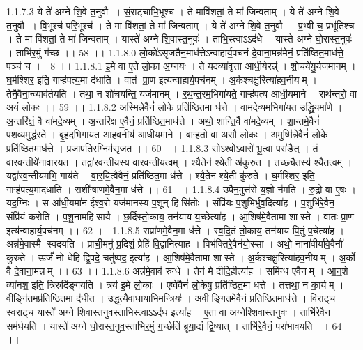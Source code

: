 1.1.7.3
ये ते॑ अग्ने शि॒वे त॒नुवौ । सं॒राट्चा॑भि॒भूश्च॑ । ते मावि॑शतां॒ ते मा॑ जिन्वताम् । ये ते॑ अग्ने शि॒वे त॒नुवौ । वि॒भूश्च॑ परि॒भूश्च॑ । ते मा वि॑शतां॒ ते मा॑ जिन्वताम् । ये ते॑ अग्ने शि॒वे त॒नुवौ । प्र॒भ्वी च॒ प्रभू॑तिश्च । ते मा वि॑शतां॒ ते मा॑ जिन्वताम् । यास्ते॑ अग्ने शि॒वास्त॒नुवः॑ । ताभि॒स्त्वाऽऽद॑धे । यास्ते॑ अग्ने घो॒रास्त॒नुवः॑ । ताभि॑र॒मुं ग॑च्छ ।। 58 ।।
1.1.8.0
लो॒को॑ऽसृजतैन॒माध॑त्तेऽन्वाहार्य॒पच॑नं दे॒वाना॒मन्न॑मेनं॒ प्रति॑ष्ठित॒माध॑त्ते॒ पञ्च॑ च ।। 8 ।।
1.1.8.1
इ॒मे वा ए॒ते लो॒का अ॒ग्नयः॑ । ते यदव्या॑वृत्ता आधी॒येरन्न्॑ । शो॒चये॑यु॒र्यज॑मानम् । घ॒र्मश्शिर॒ इति॒ गाऱ्ह॑पत्य॒मा द॑धाति । वात॑ प्रा॒ण इत्य॑न्वाहार्य॒पच॑नम् । अ॒र्कश्चक्षु॒रित्या॑हव॒नीयम् । तेनै॒वैना॒न्व्याव॑र्तयति । तथा॒ न शो॑चयन्ति॒ यज॑मानम् । र॒थ॒न्त॒रम॒भिगा॑यते॒ गाऱ्ह॑पत्य आधी॒यमा॑ने । राथ॑न्तरो॒ वा अ॒यं लो॒कः ।। 59 ।।
1.1.8.2
अ॒स्मिन्ने॒वैनं॑ लो॒के प्रति॑ष्ठित॒मा ध॑त्ते । वा॒म॒दे॒व्यम॒भिगा॑यत उद्ध्रि॒यमा॑णे । अ॒न्तरि॑क्षं॒ वै वा॑मदे॒व्यम् । अ॒न्तरि॑क्ष ए॒वैनं॒ प्रति॑ष्ठित॒माध॑त्ते । अथो॒ शान्ति॒र्वै वा॑मदे॒व्यम् । शा॒न्तमे॒वैनं॑ पश॒व्य॑मुद्ध॑रते । बृ॒हद॒भिगा॑यत आहव॒नीय॑ आधी॒यमा॑ने । बाऱ्ह॑तो॒ वा अ॒सौ लो॒कः । अ॒मुष्मि॑न्ने॒वैनं॑ लो॒के प्रति॑ष्ठित॒माध॑त्ते । प्र॒जाप॑तिर॒ग्निम॑सृजत ।। 60 ।।
1.1.8.3
सोऽश्वो॒ऽवारो॑ भू॒त्वा परा॑ङैत् । तं वा॑रव॒न्तीये॑नावारयत । तद्वा॑रव॒न्तीय॑स्य वारवन्तीय॒त्वम् । श्यै॒तेन॑ श्ये॒ती अ॑कुरुत । तच्छ्यै॒तस्य॑ श्यैत॒त्वम् । यद्वा॑रव॒न्तीय॑मभि॒ गाय॑ते । वा॒र॒यि॒त्वैवैनं॒ प्रति॑ष्ठित॒मा ध॑त्ते । श्यै॒तेन॑ श्ये॒ती कु॑रुते । घ॒र्मश्शिर॒ इति॒ गाऱ्ह॑पत्य॒माद॑धाति । सशी॑ऱ्षाणमे॒वैन॒मा ध॑त्ते ।। 61 ।।
1.1.8.4
उपै॑न॒मुत्त॑रो य॒ज्ञो न॑मति । रु॒द्रो वा ए॒षः । यद॒ग्निः । स आ॑धी॒यमा॑न ईश्व॒रो यज॑मानस्य प॒शून् हिसि॑तोः । संप्रि॑यः प॒शुभि॑र्भुव॒दित्या॑ह । प॒शुभि॑रे॒वैन॒॒ संप्रि॑यं करोति । प॒शू॒नामहि॑सायै । छ॒र्दिस्तो॒काय॒ तन॑याय य॒च्छेत्या॑ह । आ॒शिष॑मे॒वैतामा शास्ते । वातः॑ प्रा॒ण इत्य॑न्वाहार्य॒पच॑नम् ।। 62 ।।
1.1.8.5
सप्रा॑णमे॒वैन॒मा ध॑त्ते । स्व॒दि॒तं तो॒काय॒ तन॑याय पि॒तुं प॒चेत्या॑ह । अन्न॑मे॒वास्मै स्वदयति । प्राची॒मनु॑ प्र॒दिशं॒ प्रेहि॑ वि॒द्वानित्या॑ह । विभ॑क्तिरे॒वैन॑यो॒स्सा । अथो॒ नाना॑वीर्यावे॒वैनौ॑ कुरुते । ऊर्जं॑ नो धेहि द्वि॒पदे॒ चतु॑ष्पद॒ इत्या॑ह । आ॒शिष॑मे॒वैतामा शास्ते । अ॒र्कश्चक्षु॒रित्या॑हव॒नीयम् । अ॒र्को वै दे॒वाना॒मन्नम् ।। 63 ।।
1.1.8.6
अन्न॑मे॒वाव॑ रुन्धे । तेन॑ मे दीदि॒हीत्या॑ह । समि॑न्ध ए॒वैनम् । आ॒न॒शे व्या॑नश॒ इति॒ त्रिरुदि॑ङ्गयति । त्रय॑ इ॒मे लो॒काः । ए॒ष्वे॑वैनं॑ लो॒केषु॒ प्रति॑ष्ठित॒मा ध॑त्ते । तत्तथा॒ न का॒र्यम् । वीङ्गि॑त॒मप्र॑तिष्ठित॒मा द॑धीत । उ॒द्धृत्यै॒वाधाया॑भि॒मन्त्रियः॑ । अवीङ्गितमे॒वैनं॒ प्रति॑ष्ठित॒माध॑त्ते । वि॒राट्च॑ स्व॒राट्च॒ यास्ते॑ अग्ने शि॒वास्त॒नुव॒स्ताभि॒स्त्वाऽऽद॑ध॒ इत्या॑ह । ए॒ता वा अ॒ग्नेश्शि॒वास्त॒नुवः॑ । ताभि॑रे॒वैन॒॒ सम॑र्धयति । यास्ते॑ अग्ने घो॒रास्त॒नुव॒स्ताभि॑र॒मुं ग॒च्छेति॑ ब्रूया॒द्यं द्वि॒ष्यात् । ताभि॑रे॒वैनं॒ परा॑भावयति ।। 64 ।।
